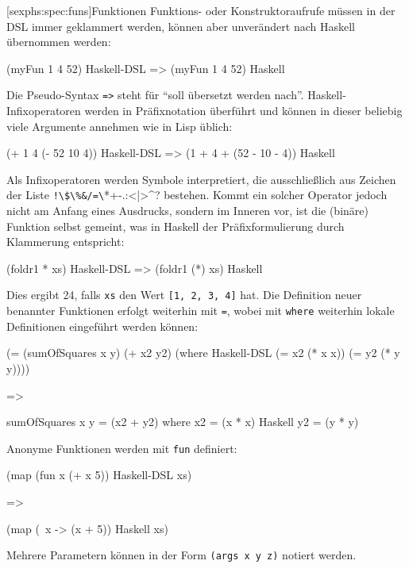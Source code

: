 \documentclass[12pt, a4paper, bibgerm]{scrbook}
\newenvironment{DIFnomarkup}{}{}
\newcommand\icode[1]{\lstinline?#1?}
\newcommand\lsubsection{}
\begin{document}
\lsubsection[sexphs:spec:funs]{Funktionen}
Funktions- oder Konstruktoraufrufe müssen in der DSL immer
geklammert werden, können aber unverändert nach Haskell übernommen
werden:
\begin{DIFnomarkup}\begin{code}
(myFun 1 4 52)              Haskell-DSL
=>
(myFun 1 4 52)              Haskell
\end{code}\end{DIFnomarkup}
Die Pseudo-Syntax \icode{=>} steht für "`soll übersetzt werden
nach"'. Haskell-Infixoperatoren werden in Präfixnotation überführt und
können in dieser beliebig viele Argumente annehmen wie in Lisp üblich:
\begin{DIFnomarkup}\begin{code}
(+ 1 4 (- 52 10 4))         Haskell-DSL
=>
(1 + 4 + (52 - 10 - 4))     Haskell
\end{code}\end{DIFnomarkup}
Als Infixoperatoren werden Symbole interpretiert, die ausschließlich
aus Zeichen der Liste \icode{!\$\%&/=\?*+-.:<|>^}
bestehen. Kommt ein solcher Operator jedoch nicht am Anfang eines
Ausdrucks, sondern im Inneren vor, ist die (binäre) Funktion selbst
gemeint, was in Haskell der Präfixformulierung durch Klammerung
entspricht:
\begin{DIFnomarkup}\begin{code}
(foldr1 * xs)               Haskell-DSL
=>
(foldr1 (*) xs)             Haskell
\end{code}\end{DIFnomarkup}
Dies ergibt 24, falls \icode{xs} den Wert \icode{[1, 2, 3, 4]} hat.
Die Definition neuer benannter Funktionen erfolgt weiterhin mit
\icode{=}, wobei mit \icode{where} weiterhin lokale Definitionen
eingeführt werden können:
\begin{DIFnomarkup}\begin{code}
(= (sumOfSquares x y)
   (+ x2 y2)
 (where                     Haskell-DSL
  (= x2 (* x x))
  (= y2 (* y y))))

=>

sumOfSquares x y = (x2 + y2)
  where
    x2 = (x * x)            Haskell
    y2 = (y * y)
\end{code}\end{DIFnomarkup}
Anonyme Funktionen werden mit \icode{fun} definiert:
\begin{DIFnomarkup}\begin{code}
(map 
  (fun x (+ x 5))           Haskell-DSL
  xs)

=>

(map
  (\ x -> (x + 5))          Haskell
  xs)
\end{code}\end{DIFnomarkup}
Mehrere Parametern können in der Form
\icode{(args x y z)} notiert werden.
\end{document}
